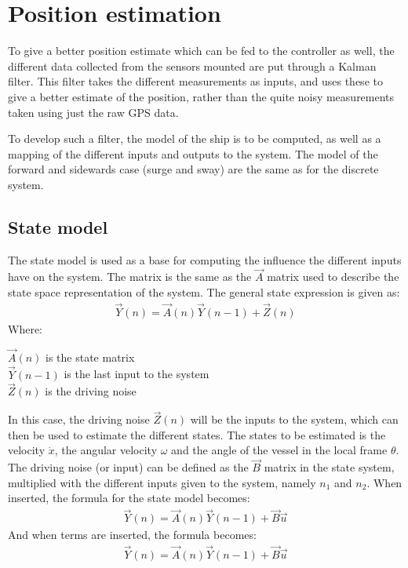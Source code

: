 \section{Position estimation}
To give a better position estimate which can be fed to the controller as well, the different data collected from the sensors mounted are put through a Kalman filter. This filter takes the different measurements as inputs, and uses these to give a better estimate of the position, rather than the quite noisy measurements taken using just the raw \ac{GPS} data. 

To develop such a filter, the model of the ship is to be computed, as well as a mapping of the different inputs and outputs to the system. The model of the forward and sidewards case (surge and sway) are the same as for the discrete system. 

\subsection{State model}
The state model is used as a base for computing the influence the different inputs have on the system. The matrix is the same as the $\vec{A}$ matrix used to describe the state space representation of the system. The general state expression is given as:
\begin{align}
\vec{Y}(n) = \vec{A}(n)\vec{Y}(n-1) + \vec{Z}(n)
\end{align}
\noindent Where:
\begin{ffk}
$\vec{A}(n)$ is the state matrix\\
$\vec{Y}(n-1)$ is the last input to the system\\
$\vec{Z}(n)$ is the driving noise
\end{ffk}
In this case, the driving noise $\vec{Z}(n)$ will be the inputs to the system, which can then be used to estimate the different states. The states to be estimated is the velocity $\dot{x}$, the angular velocity $\omega$ and the angle of the vessel in the local frame $\theta$. The driving noise (or input) can be defined as the $\vec{B}$ matrix in the state system, multiplied with the different inputs given to the system, namely $n_1$ and $n_2$. When inserted, the formula for the state model becomes:
\begin{align}
\vec{Y}(n) = \vec{A}(n)\vec{Y}(n-1) + \vec{B}\vec{u}
\end{align}
And when terms are inserted, the formula becomes: 
\begin{align}
\vec{Y}(n) = \vec{A}(n)\vec{Y}(n-1) + \vec{B}\vec{u}
\end{align}

